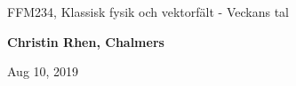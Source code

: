 \documentclass[%
oneside,                 %
final,                   %
10pt]{article}
\begin{document}

\newcommand{\exercisesection}[1]{\subsection*{#1}}






\thispagestyle{empty}

\begin{center}
{\LARGE\bf
\begin{spacing}{1.25}
FFM234, Klassisk fysik och vektorfält - Veckans tal
\end{spacing}
}
\end{center}


\begin{center}
{\bf Christin Rhen, Chalmers${}^{}$} \\ [0mm]
\end{center}

\begin{center}
\end{center}
    

\begin{center}
Aug 10, 2019
\end{center}

\vspace{1cm}
\end{document}
